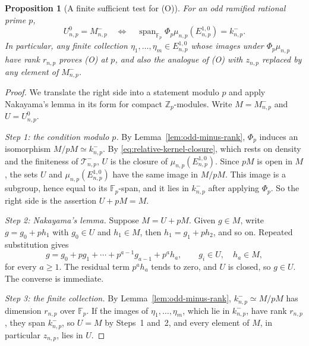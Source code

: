 \documentclass[11pt]{article}
\theoremstyle{plain}
\newtheorem{proposition}[theorem]{Proposition}
\theoremstyle{definition}
\theoremstyle{remark}
\newcommand{\Z}{\mathbb Z}
\newcommand{\F}{\mathbb F}
\begin{document}
\begin{proposition}[A finite sufficient test for (O)]\label{prop:odd-certificate}
For an odd ramified rational prime $p$,
\[
 U_{n,p}^0=M_{n,p}^-
 \quad\Longleftrightarrow\quad
 \operatorname{span}_{\F_p}
 \Phi_p\mu_{n,p}(E_{n,p}^{1,0})=k_{n,p}^-.
\]
In particular, any finite collection
$\eta_1,\ldots,\eta_m\in E_{n,p}^{1,0}$ whose images under
$\Phi_p\mu_{n,p}$ have rank $r_{n,p}$ proves (O) at $p$, and also the
analogue of (O) with $z_{n,p}$ replaced by any element of $M_{n,p}^-$.
\end{proposition}
\begin{proof}
We translate the right side into a statement modulo $p$ and apply
Nakayama's lemma in its form for compact $\Z_p$-modules.  Write
$M=M_{n,p}^-$ and $U=U_{n,p}^0$.

\emph{Step 1: the condition modulo $p$.}  By
Lemma~\ref{lem:odd-minus-rank}, $\Phi_p$ induces an isomorphism
$M/pM\simeq k_{n,p}^-$.  By \eqref{eq:relative-kernel-closure}, which
rests on density and the finiteness of $\mathcal T^-_{n,p}$, $U$ is the
closure of $\mu_{n,p}(E_{n,p}^{1,0})$.  Since $pM$ is open in $M$, the
sets $U$ and $\mu_{n,p}(E_{n,p}^{1,0})$ have the same image in $M/pM$.
This image is a subgroup, hence equal to its $\F_p$-span, and it lies in
$k_{n,p}^-$ after applying $\Phi_p$.  So the right side is the assertion
$U+pM=M$.

\emph{Step 2: Nakayama's lemma.}  Suppose $M=U+pM$.  Given $g\in M$,
write $g=g_0+ph_1$ with $g_0\in U$ and $h_1\in M$, then
$h_1=g_1+ph_2$, and so on.  Repeated substitution gives
\[
 g=g_0+pg_1+\cdots+p^{a-1}g_{a-1}+p^ah_a,
 \qquad g_i\in U,\quad h_a\in M,
\]
for every $a\ge1$.  The residual term $p^ah_a$ tends to zero, and $U$ is
closed, so $g\in U$.  The converse is immediate.

\emph{Step 3: the finite collection.}  By Lemma~\ref{lem:odd-minus-rank},
$k_{n,p}^-\simeq M/pM$ has dimension $r_{n,p}$ over $\F_p$.  If the
images of $\eta_1,\ldots,\eta_m$, which lie in $k_{n,p}^-$, have rank
$r_{n,p}$, they span $k_{n,p}^-$, so $U=M$ by Steps~1 and~2, and every element of $M$,
in particular $z_{n,p}$, lies in $U$.
\end{proof}
\end{document}
